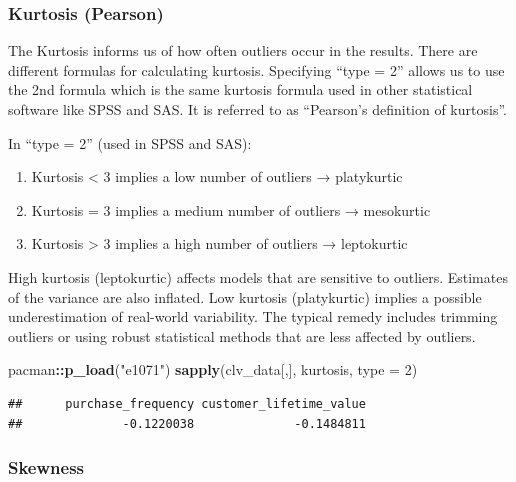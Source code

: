 \documentclass[
]{article}
\newenvironment{Shaded}{\begin{snugshade}}{\end{snugshade}}
\newcommand{\AttributeTok}[1]{\textcolor[rgb]{0.13,0.29,0.53}{#1}}
\newcommand{\DecValTok}[1]{\textcolor[rgb]{0.00,0.00,0.81}{#1}}
\newcommand{\FunctionTok}[1]{\textcolor[rgb]{0.13,0.29,0.53}{\textbf{#1}}}
\newcommand{\NormalTok}[1]{#1}
\newcommand{\SpecialCharTok}[1]{\textcolor[rgb]{0.81,0.36,0.00}{\textbf{#1}}}
\newcommand{\StringTok}[1]{\textcolor[rgb]{0.31,0.60,0.02}{#1}}
\begin{document}
\subsubsection{\texorpdfstring{\textbf{Kurtosis
(Pearson)}}{Kurtosis (Pearson)}}\label{kurtosis-pearson}

The Kurtosis informs us of how often outliers occur in the results.
There are different formulas for calculating kurtosis. Specifying ``type
= 2'' allows us to use the 2nd formula which is the same kurtosis
formula used in other statistical software like SPSS and SAS. It is
referred to as ``Pearson's definition of kurtosis''.

In ``type = 2'' (used in SPSS and SAS):

\begin{enumerate}
\def\labelenumi{\arabic{enumi}.}
\item
  Kurtosis \textless{} 3 implies a low number of outliers → platykurtic
\item
  Kurtosis = 3 implies a medium number of outliers → mesokurtic
\item
  Kurtosis \textgreater{} 3 implies a high number of outliers →
  leptokurtic
\end{enumerate}

High kurtosis (leptokurtic) affects models that are sensitive to
outliers. Estimates of the variance are also inflated. Low kurtosis
(platykurtic) implies a possible underestimation of real-world
variability. The typical remedy includes trimming outliers or using
robust statistical methods that are less affected by outliers.

\begin{Shaded}
\begin{Highlighting}[]
\NormalTok{pacman}\SpecialCharTok{::}\FunctionTok{p\_load}\NormalTok{(}\StringTok{"e1071"}\NormalTok{)}
\FunctionTok{sapply}\NormalTok{(clv\_data[,],  kurtosis, }\AttributeTok{type =} \DecValTok{2}\NormalTok{)}
\end{Highlighting}
\end{Shaded}

\begin{verbatim}
##      purchase_frequency customer_lifetime_value 
##              -0.1220038              -0.1484811
\end{verbatim}

\subsubsection{\texorpdfstring{\textbf{Skewness}}{Skewness}}\label{skewness}
\end{document}
